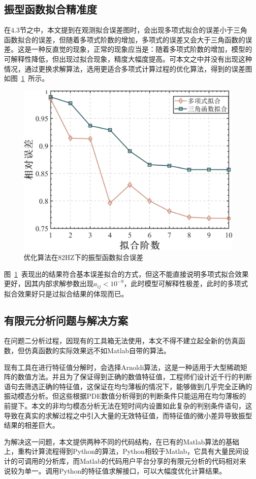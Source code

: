 \documentclass[withoutpreface,bwprint]{cumcmthesis} %
\begin{document}
\subsection{振型函数拟合精准度}
在4.3节之中，本文提到在观测拟合误差图时，会出现多项式拟合的误差小于三角函数拟合的误差，但随着多项式阶数的增加，多项式的误差又会大于三角函数的误差。这是一种反直觉的现象，正常的现象应当是：随着多项式阶数的增加，模型的可解释性降低，但出现过拟合现象，精度大幅度提高。可本文之中并没有出现这种情况，通过更换求解算法，选用更适合多项式计算过程的优化算法，得到的误差图如图~\ref{newwucha}~所示。
\begin{figure}[H]
\centering %
\includegraphics[width=0.6\linewidth]{CUMCMThesis-master/figures/1_1_00.png}\caption{优化算法在82HZ下的振型函数拟合误差}
\label{newwucha}
\end{figure}
图~\ref{newwucha}~表现出的结果符合基本误差拟合的方式，但这不能直接说明多项式拟合效果更好，因其内部求解参数出现$a_{ij}<10^{-9}$，此时模型可解释性极差，此时的多项式拟合效果好只是过拟合结果的体现而已。
\subsection{有限元分析问题与解决方案}
在问题二分析过程，因现有的工具箱无法使用，本文不得不建立起全新的仿真函数，但仿真函数的实际效果远不如Matlab自带的算法。

现有工具在进行特征值分解时，会选择Arnoldi算法，这是一种适用于大型稀疏矩阵的数值方法。并且为了保证得到正确的数值特征值，工程师们设计近千行的判断语句去筛选正确的特征值，这保证在均匀薄板的情况下，能够做到几乎完全正确的振动模态分析。但这些根据PDE数值分析得到的判断条件只能运用在均匀薄板的前提下。本文的非均匀模态分析无法在短时间内设置如此复杂的判别条件语句，这导致在真实的求解过程之中引入大量的无效特征值，而特征值的微小差异导致振型结果的相差巨大。

为解决这一问题，本文提供两种不同的代码结构，在已有的Matlab算法的基础上，重构计算流程得到Python的算法，Python相较于Matlab，它具有大量民间设计的可调用的分析库，而Matlab的代码用户平台分享的有限元分析的代码相对来说较为单一。调用Python的特征值求解接口，可以大幅度优化计算结果。
\end{document}
